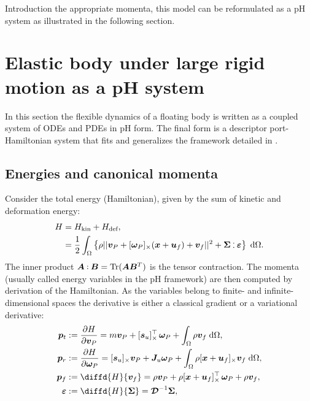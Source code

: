 \documentclass{svjour3}                     %
\DeclareMathOperator{\Tr}{Tr}
\newcommand{\crmat}[1]{\ensuremath{[#1]_{\times}}}
\def\onedot{$\mathsurround0pt\ldotp$}
\def\cddot{%
	\mathbin{\vcenter{\baselineskip.67ex
			\hbox{\onedot}\hbox{\onedot}}%
}}
\begin{document}
 Introduction the appropriate momenta, this model can be reformulated as a pH system as illustrated in the following section.

\section{Elastic body under large rigid motion as a pH system}
\label{sec:pH_fd}
In this section the flexible dynamics of a floating body is written as a coupled system of ODEs and PDEs in pH form. The final form is a descriptor port-Hamiltonian system that fits and generalizes the framework detailed in \cite{beattie2018linear,mehrmann2019structurepreserving}.  

\subsection{Energies and canonical momenta}
Consider the total energy (Hamiltonian), given by the sum of kinetic and deformation energy:
\begin{equation}
\label{eq:H}
\begin{aligned}
H &= H_{\text{kin}} + H_{\text{def}}, \\
&= \frac{1}{2} \int_{\Omega} \left\{\rho ||\bm{v}_P + \crmat{\bm{\omega}_P} (\bm{x}+\bm{u}_f) + {\bm{v}}_f||^2 + \bm\Sigma \cddot \bm\varepsilon \right\}  \d{\Omega}.
\end{aligned}
\end{equation}
The inner product $\bm{A} \cddot \bm{B} = \Tr(\bm{A} \bm{B}^T)$ is the tensor contraction.  
The momenta (usually called energy variables in the pH framework) are then computed by derivation of the Hamiltonian. As the variables belong to finite- and infinite-dimensional spaces the derivative is either a classical gradient or a variational derivative:
\begin{equation}
\label{eq:momenta}
\begin{aligned}
\bm{p}_t &:= \diffp{H}{\bm{v}_P} = m \bm{v}_P + \crmat{\bm{s}_u}^\top \, \bm\omega_P + \int_{\Omega} \rho \bm{v}_f \d{\Omega}, \\
\bm{p}_r &:= \diffp{H}{\bm\omega_P} = \crmat{\bm{s}_u} \bm{v}_P + \bm{J}_u \bm\omega_P + \int_{\Omega} \rho \crmat{\bm{x}+\bm{u}_f} \bm{v}_f \d{\Omega}, \\
\bm{p}_f &:= \diffd{H}{\bm{v}_f} = \rho \bm{v}_P + \rho \crmat{\bm{x}+\bm{u}_f}^\top \, \bm\omega_P + \rho \bm{v}_f, \\
\bm\varepsilon &:= \diffd{H}{\bm\Sigma} = \bm{\mathcal{D}}^{-1} \bm\Sigma,
\end{aligned}
\end{equation}
\end{document}
